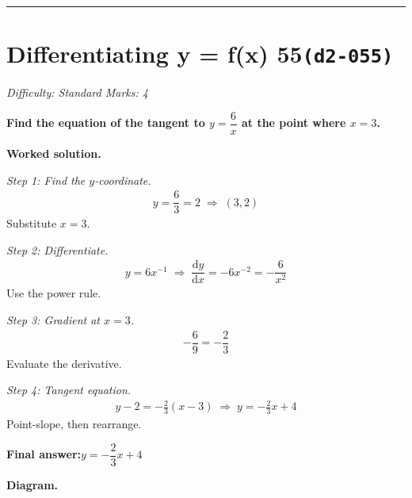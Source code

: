 \documentclass[11pt]{article}
\newcommand{\question}[1]{\par\medskip\noindent\textbf{#1}\par}
\begin{document}
\medskip\hrule

\section*{Differentiating y = f(x) 55\quad\small\texttt{(d2-055)}}
\textit{Difficulty: Standard \quad\textbar\quad Marks: 4}

\question{Find the equation of the tangent to \( y = \dfrac{6}{x} \) at the point where \( x = 3 \).}

\textbf{Worked solution.}

\textit{Step 1: Find the \( y \)-coordinate.}
\[\begin{gathered}
y = \dfrac{6}{3} = 2 \;\Rightarrow\; (3, 2)
\end{gathered}\]
Substitute \( x = 3 \).

\textit{Step 2: Differentiate.}
\[\begin{gathered}
y = 6x^{-1} \;\Rightarrow\; \dfrac{\mathrm{d}y}{\mathrm{d}x} = -6x^{-2} = -\dfrac{6}{x^2}
\end{gathered}\]
Use the power rule.

\textit{Step 3: Gradient at \( x = 3 \).}
\[\begin{gathered}
-\dfrac{6}{9} = -\dfrac{2}{3}
\end{gathered}\]
Evaluate the derivative.

\textit{Step 4: Tangent equation.}
\[\begin{gathered}
y - 2 = -\tfrac{2}{3}(x - 3) \;\Rightarrow\; y = -\tfrac{2}{3}x + 4
\end{gathered}\]
Point-slope, then rearrange.

\begin{answerbox}
\textbf{Final answer:}\quad \(\displaystyle  y = -\dfrac{2}{3}x + 4 \)
\end{answerbox}
\textbf{Diagram.}
\end{document}
